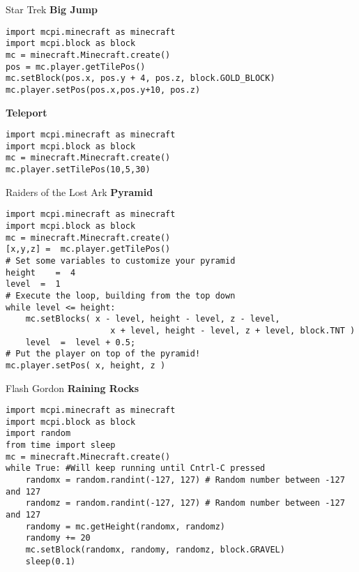 \documentclass[avery5388,grid]{flashcards}
\begin{document}
\begin{flashcard}[API]{Star Trek}
{\bf Big Jump}
\begin{lstlisting}
import mcpi.minecraft as minecraft
import mcpi.block as block
mc = minecraft.Minecraft.create()
pos = mc.player.getTilePos()
mc.setBlock(pos.x, pos.y + 4, pos.z, block.GOLD_BLOCK)
mc.player.setPos(pos.x,pos.y+10, pos.z) 
\end{lstlisting}

{\bf Teleport}
\begin{lstlisting}
import mcpi.minecraft as minecraft
import mcpi.block as block
mc = minecraft.Minecraft.create()
mc.player.setTilePos(10,5,30)
\end{lstlisting}
\end{flashcard}


\begin{flashcard}[API]{Raiders of the Lost Ark}
{\bf Pyramid}
\begin{lstlisting}
import mcpi.minecraft as minecraft
import mcpi.block as block
mc = minecraft.Minecraft.create()
[x,y,z] =  mc.player.getTilePos()
# Set some variables to customize your pyramid
height    =  4
level  =  1
# Execute the loop, building from the top down
while level <= height:
	mc.setBlocks( x - level, height - level, z - level,
	                 x + level, height - level, z + level, block.TNT )
	level  =  level + 0.5;
# Put the player on top of the pyramid!
mc.player.setPos( x, height, z )
\end{lstlisting}
\end{flashcard}

\begin{flashcard}[API]{Flash Gordon}
{\bf Raining Rocks}
\begin{lstlisting}
import mcpi.minecraft as minecraft
import mcpi.block as block
import random
from time import sleep
mc = minecraft.Minecraft.create()
while True: #Will keep running until Cntrl-C pressed
    randomx = random.randint(-127, 127) # Random number between -127 and 127
    randomz = random.randint(-127, 127) # Random number between -127 and 127
    randomy = mc.getHeight(randomx, randomz)
    randomy += 20
    mc.setBlock(randomx, randomy, randomz, block.GRAVEL)
    sleep(0.1)
\end{lstlisting}
\end{flashcard}
\end{document}
